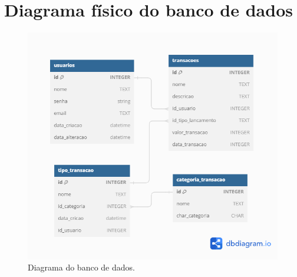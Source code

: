 \chapter{Diagrama físico do banco de dados}

\begin{figure}[htb]
	\caption{\label{fig:db-diagram}Diagrama do banco de dados.}
	\begin{center}
		\includegraphics[scale=0.5]{images/db-diagram.png}
	\end{center}
\end{figure}
